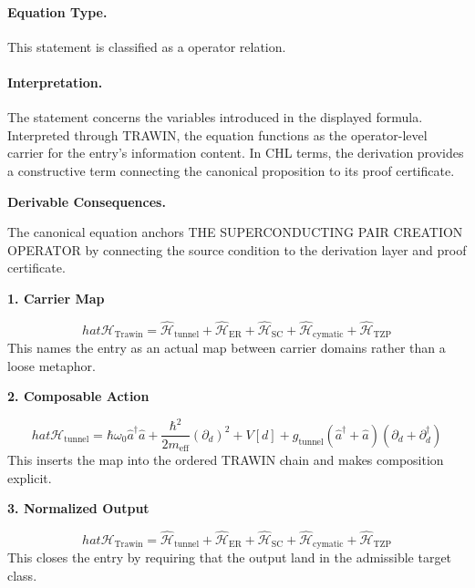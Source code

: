 \paragraph{Equation Type.}
This statement is classified as a operator relation.

\paragraph{Interpretation.}
The statement concerns the variables introduced in the displayed formula. Interpreted through TRAWIN, the equation functions as the operator-level carrier for the entry’s information content. In CHL terms, the derivation provides a constructive term connecting the canonical proposition to its proof certificate.

\par\vspace{0.35em}
\noindent\textbf{Derivable Consequences.}\quad
\begingroup
\footnotesize
\raggedright
The canonical equation anchors THE SUPERCONDUCTING PAIR CREATION OPERATOR by connecting the source condition to the derivation layer and proof certificate.
\par\endgroup

\noindent\textbf{1. Carrier Map}\par
\[
hat{\mathcal{H}}_{\text{Trawin}} = \hat{\mathcal{H}}_{\text{tunnel}} + \hat{\mathcal{H}}_{\text{ER}} + \hat{\mathcal{H}}_{\text{SC}} + \hat{\mathcal{H}}_{\text{cymatic}} + \hat{\mathcal{H}}_{\text{TZP}}
\]
\noindent This names the entry as an actual map between carrier domains rather than a loose metaphor.\par
\noindent\textbf{2. Composable Action}\par
\[
hat{\mathcal{H}}_{\text{tunnel}} = \hbar \omega_0 \hat{a}^\dagger \hat{a} + \frac{\hbar^2}{2m_{\text{eff}}} (\partial_d)^2 + V[d] + g_{\text{tunnel}} (\hat{a}^\dagger + \hat{a})(\partial_d + \partial_d^\dagger)
\]
\noindent This inserts the map into the ordered TRAWIN chain and makes composition explicit.\par
\noindent\textbf{3. Normalized Output}\par
\[
hat{\mathcal{H}}_{\text{Trawin}} = \hat{\mathcal{H}}_{\text{tunnel}} + \hat{\mathcal{H}}_{\text{ER}} + \hat{\mathcal{H}}_{\text{SC}} + \hat{\mathcal{H}}_{\text{cymatic}} + \hat{\mathcal{H}}_{\text{TZP}}
\]
\noindent This closes the entry by requiring that the output land in the admissible target class.\par

